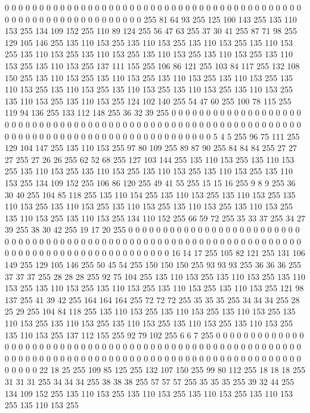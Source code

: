 0 0 0 0 0 0 0 0 0 0 0 0 0 0 0 0 0 0 0 0 0 0 0 0 0 0 0 0 0 0 0 0 0 0 0 0 0 0 0 0 0 0 0 0 0 0 0 0 0 0 0 0 0 0 0 0 0 0 0 0 0 0 0 255
81 64 93 255 125 100 143 255 135 110 153 255 134 109 152 255 110 89 124 255 56 47 63 255 37 30 41 255 87 71 98 255 129 105 146 255 135 110 153 255 135 110 153 255 135 110 153 255 135 110 153 255 135 110 153 255 135 110 153 255 135 110 153 255
135 110 153 255 135 110 153 255 135 110 153 255 137 111 155 255 106 86 121 255 103 84 117 255 132 108 150 255 135 110 153 255 135 110 153 255 135 110 153 255 135 110 153 255 135 110 153 255 135 110 153 255 135 110 153 255 135 110 153 255 135 110 153 255
135 110 153 255 135 110 153 255 124 102 140 255 54 47 60 255 100 78 115 255 119 94 136 255 133 112 148 255 36 32 39 255 0 0 0 0 0 0 0 0 0 0 0 0 0 0 0 0 0 0 0 0 0 0 0 0 0 0 0 0 0 0 0 0
0 0 0 0 0 0 0 0 0 0 0 0 0 0 0 0 0 0 0 0 0 0 0 0 0 0 0 0 0 0 0 0 0 0 0 0 0 0 0 0 0 0 0 0 0 0 0 0 0 0 0 0 0 0 0 0 0 0 0 0 5 4 5 255
96 75 111 255 129 104 147 255 135 110 153 255 97 80 109 255 89 87 90 255 84 84 84 255 27 27 27 255 27 26 26 255 62 52 68 255 127 103 144 255 135 110 153 255 135 110 153 255 135 110 153 255 135 110 153 255 135 110 153 255 135 110 153 255
135 110 153 255 134 109 152 255 106 86 120 255 49 41 55 255 15 15 16 255 9 8 9 255 36 30 40 255 104 85 118 255 135 110 154 255 135 110 153 255 135 110 153 255 135 110 153 255 135 110 153 255 135 110 153 255 135 110 153 255 135 110 153 255
135 110 153 255 135 110 153 255 134 110 152 255 66 59 72 255 35 33 37 255 34 27 39 255 38 30 42 255 19 17 20 255 0 0 0 0 0 0 0 0 0 0 0 0 0 0 0 0 0 0 0 0 0 0 0 0 0 0 0 0 0 0 0 0
0 0 0 0 0 0 0 0 0 0 0 0 0 0 0 0 0 0 0 0 0 0 0 0 0 0 0 0 0 0 0 0 0 0 0 0 0 0 0 0 0 0 0 0 0 0 0 0 0 0 0 0 0 0 0 0 0 0 0 0 16 14 17 255
105 82 121 255 131 106 149 255 129 105 146 255 50 45 54 255 150 150 150 255 93 93 93 255 36 36 36 255 37 37 37 255 28 28 28 255 92 75 104 255 135 110 153 255 135 110 153 255 135 110 153 255 135 110 153 255 135 110 153 255 135 110 153 255
135 110 153 255 121 98 137 255 41 39 42 255 164 164 164 255 72 72 72 255 35 35 35 255 34 34 34 255 28 25 29 255 104 84 118 255 135 110 153 255 135 110 153 255 135 110 153 255 135 110 153 255 135 110 153 255 135 110 153 255 135 110 153 255
135 110 153 255 135 110 153 255 137 112 155 255 92 79 102 255 6 6 7 255 0 0 0 0 0 0 0 0 0 0 0 0 0 0 0 0 0 0 0 0 0 0 0 0 0 0 0 0 0 0 0 0 0 0 0 0 0 0 0 0 0 0 0 0
0 0 0 0 0 0 0 0 0 0 0 0 0 0 0 0 0 0 0 0 0 0 0 0 0 0 0 0 0 0 0 0 0 0 0 0 0 0 0 0 0 0 0 0 0 0 0 0 0 0 0 0 0 0 0 0 0 0 0 0 22 18 25 255
109 85 125 255 132 107 150 255 99 80 112 255 18 18 18 255 31 31 31 255 34 34 34 255 38 38 38 255 57 57 57 255 35 35 35 255 39 32 44 255 134 109 152 255 135 110 153 255 135 110 153 255 135 110 153 255 135 110 153 255 135 110 153 255
